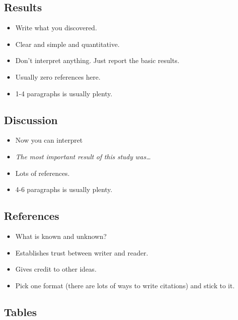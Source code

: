\documentclass[
]{article}
\providecommand{\tightlist}{%
  \setlength{\itemsep}{0pt}\setlength{\parskip}{0pt}}
\begin{document}
\hypertarget{results}{%
\subsection{Results}\label{results}}

\begin{itemize}
\tightlist
\item
  Write what you discovered.
\item
  Clear and simple and quantitative.
\item
  Don't interpret anything. Just report the basic results.
\item
  Usually zero references here.
\item
  1-4 paragraphs is usually plenty.
\end{itemize}

\hypertarget{discussion}{%
\subsection{Discussion}\label{discussion}}

\begin{itemize}
\tightlist
\item
  Now you can interpret
\item
  \emph{The most important result of this study was\ldots{}}
\item
  Lots of references.
\item
  4-6 paragraphs is usually plenty.
\end{itemize}

\hypertarget{references}{%
\subsection{References}\label{references}}

\begin{itemize}
\tightlist
\item
  What is known and unknown?
\item
  Establishes trust between writer and reader.
\item
  Gives credit to other ideas.
\item
  Pick one format (there are lots of ways to write citations) and stick
  to it.
\end{itemize}

\hypertarget{tables}{%
\subsection{Tables}\label{tables}}
\end{document}
